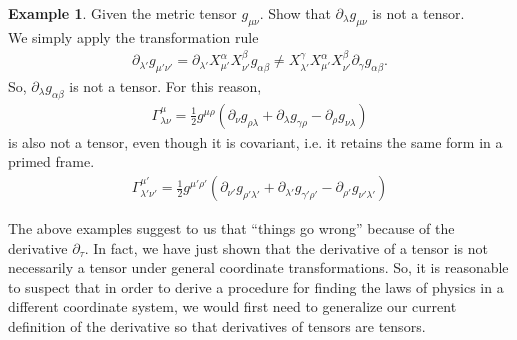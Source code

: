 \documentclass{book}
\theoremstyle{definition}
\newtheorem{exmp}{Example}[section]
\begin{document}
\begin{exmp}
	Given the metric tensor $g_{\mu\nu}$. Show that $\partial_\lambda g_{\mu\nu}$ is not a tensor.\\
	
	We simply apply the transformation rule
	\begin{align*}
	\partial_{\lambda'}g_{\mu'\nu'} = \partial_{\lambda'}X^{\alpha}_{\mu'}X^{\beta}_{\nu'}g_{\alpha\beta} \neq X^{\gamma}_{\lambda'}X^{\alpha}_{\mu'}X^{\beta}_{\nu'}\partial_{\gamma}g_{\alpha\beta}.
	\end{align*}
	So, $\partial_{\lambda}g_{\alpha\beta}$ is not a tensor. For this reason, 
	\begin{align*}
	\Gamma^{\mu}_{\lambda\nu} = \frac{1}{2}g^{\mu\rho}\left( \partial_{\nu}g_{\rho\lambda} + \partial_{\lambda}g_{\gamma\rho} - \partial_{\rho}g_{\nu\lambda}\right) 
	\end{align*}
	is also not a tensor, even though it is covariant, i.e. it retains the same form in a primed frame.
	\begin{align*}
	\Gamma^{\mu'}_{\lambda'\nu'} = \frac{1}{2}g^{\mu'\rho'}\left( \partial_{\nu'}g_{\rho'\lambda'} + \partial_{\lambda'}g_{\gamma'\rho'} - \partial_{\rho'}g_{\nu'\lambda'}\right)
	\end{align*}
\end{exmp}

The above examples suggest to us that ``things go wrong'' because of the derivative $\partial_\tau$. In fact, we have just shown that the derivative of a tensor is not necessarily a tensor under general coordinate transformations. So, it is reasonable to suspect that in order to derive a procedure for finding the laws of physics in a different coordinate system, we would first need to generalize our current definition of the derivative so that derivatives of tensors are tensors.\\
\end{document}
